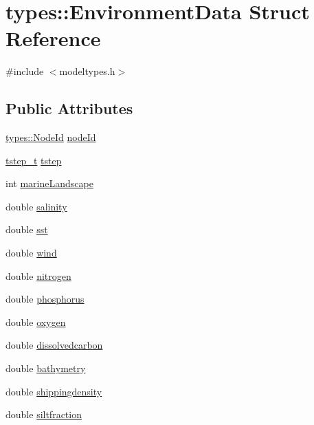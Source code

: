 \hypertarget{structtypes_1_1_environment_data}{}\section{types\+::Environment\+Data Struct Reference}
\label{structtypes_1_1_environment_data}


{\ttfamily \#include $<$modeltypes.\+h$>$}

\subsection*{Public Attributes}
\begin{DoxyCompactItemize}
\item 
\mbox{\hyperlink{classtypes_1_1_node_id}{types\+::\+Node\+Id}} \mbox{\hyperlink{structtypes_1_1_environment_data_af6e00bccb251dfec639b7287725a7723}{node\+Id}}
\item 
\mbox{\hyperlink{namespacetypes_a9dc53a5ce11a196d82a6983030de8028}{tstep\+\_\+t}} \mbox{\hyperlink{structtypes_1_1_environment_data_abe60cbbf350f269c01d997b0fefccf50}{tstep}}
\item 
int \mbox{\hyperlink{structtypes_1_1_environment_data_a931f2c9e17ae5a80895eea01d160bd23}{marine\+Landscape}}
\item 
double \mbox{\hyperlink{structtypes_1_1_environment_data_a499d542b8bd560112455ecc72beffb54}{salinity}}
\item 
double \mbox{\hyperlink{structtypes_1_1_environment_data_a7b35dad13a0ded085d6eccd46f2b5b39}{sst}}
\item 
double \mbox{\hyperlink{structtypes_1_1_environment_data_a72e7a0344d8933bb87e09f774a49d48c}{wind}}
\item 
double \mbox{\hyperlink{structtypes_1_1_environment_data_a7d2f002d3b363939a6b3f9e89d896d7d}{nitrogen}}
\item 
double \mbox{\hyperlink{structtypes_1_1_environment_data_ad6d192ab0cc323dd9b67e154127529e7}{phosphorus}}
\item 
double \mbox{\hyperlink{structtypes_1_1_environment_data_a88b2bc2ffc8621e78dedb378beff617e}{oxygen}}
\item 
double \mbox{\hyperlink{structtypes_1_1_environment_data_ac85b0a9ca827eee2c111e6a05457996d}{dissolvedcarbon}}
\item 
double \mbox{\hyperlink{structtypes_1_1_environment_data_a2eabad39e3f21d658d3816434e73b060}{bathymetry}}
\item 
double \mbox{\hyperlink{structtypes_1_1_environment_data_a2339637732679a8617c417254c687018}{shippingdensity}}
\item 
double \mbox{\hyperlink{structtypes_1_1_environment_data_a49924f793f29411c73499ddef8a08b56}{siltfraction}}
\end{DoxyCompactItemize}


